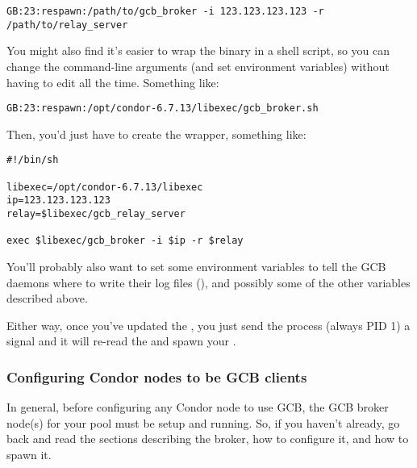 \begin{itemize}
\footnotesize
\begin{verbatim}
GB:23:respawn:/path/to/gcb_broker -i 123.123.123.123 -r /path/to/relay_server
\end{verbatim}
\normalsize

You might also find it's easier to wrap the  binary
in a shell script, so you can change the command-line arguments (and
set environment variables) without having to edit 
all the time.
Something like:

\footnotesize
\begin{verbatim}
GB:23:respawn:/opt/condor-6.7.13/libexec/gcb_broker.sh
\end{verbatim}
\normalsize

Then, you'd just have to create the wrapper, something like: 

\footnotesize
\begin{verbatim}
#!/bin/sh

libexec=/opt/condor-6.7.13/libexec
ip=123.123.123.123
relay=$libexec/gcb_relay_server

exec $libexec/gcb_broker -i $ip -r $relay
\end{verbatim}
\normalsize

You'll probably also want to set some environment variables to tell
the GCB daemons where to write their log files (),
and possibly some of the other variables described above.

Either way, once you've updated the , you just send
the  process (always PID 1) a \verb@SIGHUP@ signal and it
will re-read the  and spawn your .

\end{itemize}

\subsubsection{\label{sec:GCB-condor-config}
Configuring Condor nodes to be GCB clients}

In general, before configuring any Condor node to use GCB, the GCB
broker node(s) for your pool must be setup and running.
So, if you haven't already, go back and read the sections describing
the broker, how to configure it, and how to spawn it.


